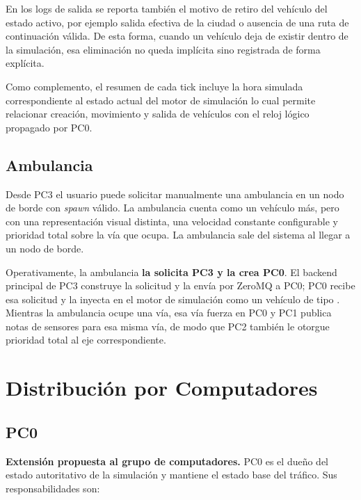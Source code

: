\documentclass[12pt, a4paper]{article}
\let\oldtexttt\texttt
\renewcommand{\texttt}[1]{\oldtexttt{\seqsplit{#1}}}
\begin{document}
En los logs de salida se reporta también el motivo de retiro del vehículo del estado activo, por ejemplo salida efectiva de la ciudad o ausencia de una ruta de continuación válida. De esta forma, cuando un vehículo deja de existir dentro de la simulación, esa eliminación no queda implícita sino registrada de forma explícita.

Como complemento, el resumen de cada tick incluye la hora simulada correspondiente al estado actual del motor de simulación lo cual permite relacionar creación, movimiento y salida de vehículos con el reloj lógico propagado por PC0.

\subsection{Ambulancia}

Desde PC3 el usuario puede solicitar manualmente una ambulancia en un nodo de borde con \textit{spawn} válido. La ambulancia cuenta como un vehículo más, pero con una representación visual distinta, una velocidad constante configurable y prioridad total sobre la vía que ocupa. La ambulancia sale del sistema al llegar a un nodo de borde.

Operativamente, la ambulancia \textbf{la solicita PC3 y la crea PC0}. El backend principal de PC3 construye la solicitud y la envía por ZeroMQ a PC0; PC0 recibe esa solicitud y la inyecta en el motor de simulación como un vehículo de tipo \texttt{AMBULANCIA}. Mientras la ambulancia ocupe una vía, esa vía fuerza \texttt{score = 1.0} en PC0 y PC1 publica notas de sensores \texttt{1.0} para esa misma vía, de modo que PC2 también le otorgue prioridad total al eje correspondiente.

\section{Distribución por Computadores}

\subsection{PC0}

\textbf{Extensión propuesta al grupo de computadores.} PC0 es el dueño del estado autoritativo de la simulación y mantiene el estado base del tráfico. Sus responsabilidades son:
\end{document}
